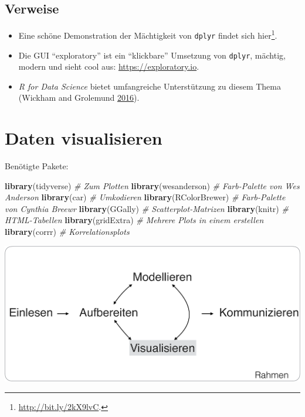 \documentclass[12pt,]{book}
\newenvironment{Shaded}{\begin{snugshade}}{\end{snugshade}}
\newcommand{\KeywordTok}[1]{\textcolor[rgb]{0.13,0.29,0.53}{\textbf{{#1}}}}
\newcommand{\CommentTok}[1]{\textcolor[rgb]{0.56,0.35,0.01}{\textit{{#1}}}}
\newcommand{\NormalTok}[1]{{#1}}
\let\rmarkdownfootnote\footnote%
\def\footnote{\protect\rmarkdownfootnote}
\begin{document}
\section{Verweise}\label{verweise-2}

\begin{itemize}
\item
  Eine schöne Demonstration der Mächtigkeit von \texttt{dplyr} findet
  sich hier\footnote{\url{http://bit.ly/2kX9lvC}.}.
\item
  Die GUI ``exploratory'' ist ein ``klickbare'' Umsetzung von
  \texttt{dplyr}, mächtig, modern und sieht cool aus:
  \url{https://exploratory.io}.
\item
  \emph{R for Data Science} bietet umfangreiche Unterstützung zu diesem
  Thema (Wickham and Grolemund \protect\hyperlink{ref-r4ds}{2016}).
\end{itemize}

\chapter{Daten visualisieren}\label{daten-visualisieren}

Benötigte Pakete:

\begin{Shaded}
\begin{Highlighting}[]
\KeywordTok{library}\NormalTok{(tidyverse)  }\CommentTok{# Zum Plotten}
\KeywordTok{library}\NormalTok{(wesanderson)  }\CommentTok{# Farb-Palette von Wes Anderson}
\KeywordTok{library}\NormalTok{(car)  }\CommentTok{# Umkodieren}
\KeywordTok{library}\NormalTok{(RColorBrewer)  }\CommentTok{# Farb-Palette von Cynthia Breewr}
\KeywordTok{library}\NormalTok{(GGally)  }\CommentTok{# Scatterplot-Matrizen}
\KeywordTok{library}\NormalTok{(knitr)  }\CommentTok{# HTML-Tabellen}
\KeywordTok{library}\NormalTok{(gridExtra)  }\CommentTok{# Mehrere Plots in einem erstellen}
\KeywordTok{library}\NormalTok{(corrr)  }\CommentTok{# Korrelationsplots}
\end{Highlighting}
\end{Shaded}

\begin{center}\includegraphics[width=0.7\linewidth]{images/Visualisieren} \end{center}
\end{document}
